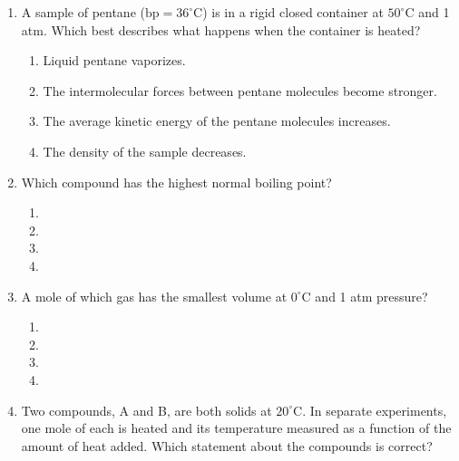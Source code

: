 \documentclass[twocolumn, 10pt]{article}
\begin{document}
\begin{enumerate}
    \item A sample of pentane ($\text{bp} = 36^\circ\text{C}$) is in a rigid closed container at $50^\circ\text{C}$ and 1 atm. Which best describes what happens when the container is heated?
    \begin{enumerate}
        \item Liquid pentane vaporizes.
        \item The intermolecular forces between pentane molecules become stronger.
        \item The average kinetic energy of the pentane molecules increases.
        \item The density of the sample decreases.
    \end{enumerate}

    \item Which compound has the highest normal boiling point?
    \begin{enumerate}
        \item {}
        \item {}
        \item {}
        \item {}
    \end{enumerate}

    \item A mole of which gas has the smallest volume at $0^\circ\text{C}$ and 1 atm pressure?
    \begin{enumerate}
        \item {}
        \item {}
        \item {}
        \item {}
    \end{enumerate}

    \item Two compounds, A and B, are both solids at $20^\circ\text{C}$. In separate experiments, one mole of each is heated and its temperature measured as a function of the amount of heat added. Which statement about the compounds is correct?
    

\end{enumerate}
\end{document}
